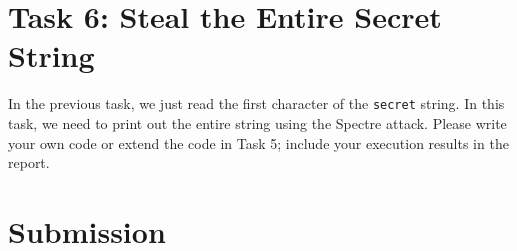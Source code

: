 \section{Task 6: Steal the Entire Secret String}

In the previous task, we  just read the first character of the \texttt{secret}
string. In this task, we need to print out the entire string using the 
Spectre attack. Please write your own code or extend the code in Task 5; include your
execution results in the report.


\section{Submission}

\seedsubmission



\def\baselinestretch{1}





